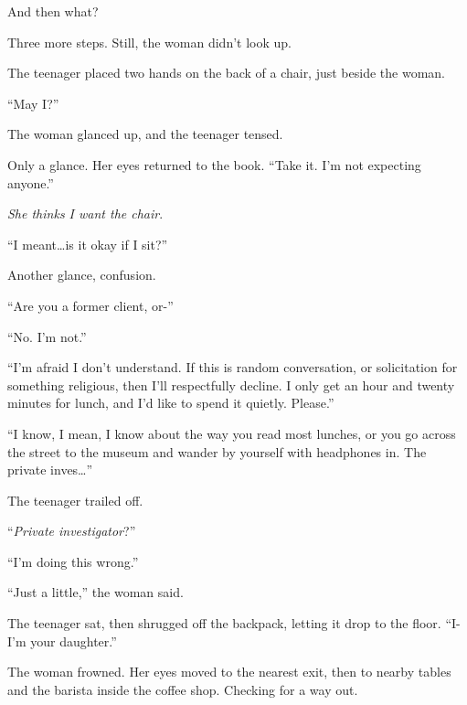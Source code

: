 And then what?



Three more steps.  Still, the woman didn't look up.



The teenager placed two hands on the back of a chair, just beside the woman.



``May I?''



The woman glanced up, and the teenager tensed.



Only a glance.  Her eyes returned to the book.  ``Take it.  I'm not expecting anyone.''



\emph{She thinks I want the chair}.



``I meant\ldots is it okay if I sit?''



Another glance, confusion.



``Are you a former client, or-''



``No.  I'm not.''



``I'm afraid I don't understand.  If this is random conversation, or solicitation for something religious, then I'll respectfully decline.  I only get an hour and twenty minutes for lunch, and I'd like to spend it quietly.  Please.''



``I know, I mean, I know about the way you read most lunches, or you go across the street to the museum and wander by yourself with headphones in.  The private inves\ldots''



The teenager trailed off.



``\emph{Private investigator}?''



``I'm doing this wrong.''



``Just a little,'' the woman said.



The teenager sat, then shrugged off the backpack, letting it drop to the floor.  ``I- I'm your daughter.''



The woman frowned.  Her eyes moved to the nearest exit, then to nearby tables and the barista inside the coffee shop.  Checking for a way out.



